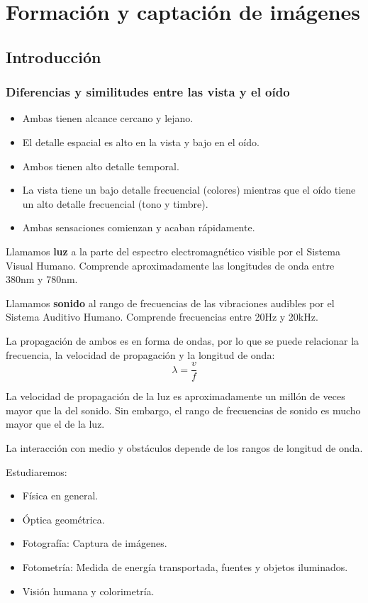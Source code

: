 \documentclass[a4paper]{book}
\begin{document}
\chapter{Formación y captación de imágenes}

\section{Introducción}

\subsection{Diferencias y similitudes entre las vista y el oído}
\begin{itemize}
	\item Ambas tienen alcance cercano y lejano.
	\item El detalle espacial es alto en la vista y bajo en el oído.
	\item Ambos tienen alto detalle temporal.
	\item La vista tiene un bajo detalle frecuencial (colores) mientras que el oído tiene un alto detalle frecuencial (tono y timbre).
	\item Ambas sensaciones comienzan y acaban rápidamente.
\end{itemize}

Llamamos \textbf{luz} a la parte del espectro electromagnético visible por el Sistema Visual Humano. Comprende aproximadamente las longitudes de onda entre 380nm y 780nm.

Llamamos \textbf{sonido} al rango de frecuencias de las vibraciones audibles por el Sistema Auditivo Humano. Comprende frecuencias entre 20Hz y 20kHz.

La propagación de ambos es en forma de ondas, por lo que se puede relacionar la frecuencia, la velocidad de propagación y la longitud de onda:
\[ \lambda = \frac{v}{f}  \]

La velocidad de propagación de la luz es aproximadamente un millón de veces mayor que la del sonido. Sin embargo, el rango de frecuencias de sonido es mucho mayor que el de la luz.

La interacción con medio y obstáculos depende de los rangos de longitud de onda.

Estudiaremos:
\begin{itemize}
	\item Física en general.
	\item Óptica geométrica.
	\item Fotografía: Captura de imágenes.
	\item Fotometría: Medida de energía transportada, fuentes y objetos iluminados.
	\item Visión humana y colorimetría.
\end{itemize}
\end{document}
